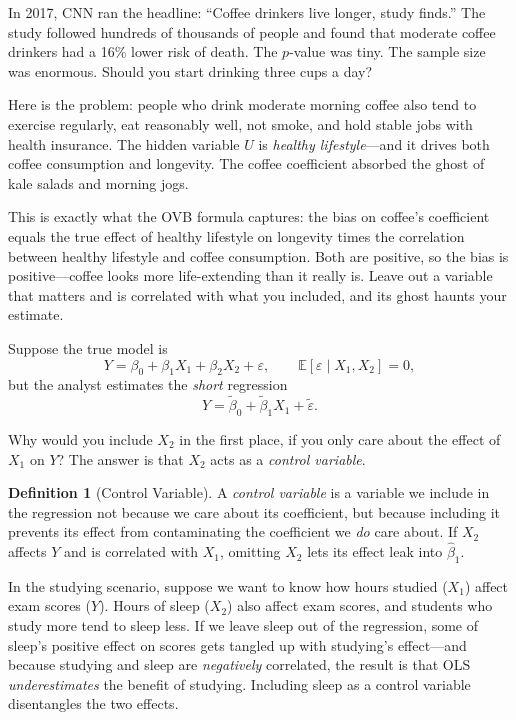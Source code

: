 \documentclass[11pt,a4paper]{article}
\theoremstyle{definition}
\newtheorem{definition}{Definition}[section]
\theoremstyle{plain}
\theoremstyle{remark}
\newcommand{\E}{\mathbb{E}}
\newcommand{\bhat}{\hat{\beta}}
\begin{document}
\begin{toystory}[title={The CNN Coffee Miracle}]
In 2017, CNN ran the headline: ``Coffee drinkers live longer, study finds.'' The study followed hundreds of thousands of people and found that moderate coffee drinkers had a 16\% lower risk of death. The $p$-value was tiny. The sample size was enormous. Should you start drinking three cups a day?

Here is the problem: people who drink moderate morning coffee also tend to exercise regularly, eat reasonably well, not smoke, and hold stable jobs with health insurance. The hidden variable $U$ is \emph{healthy lifestyle}---and it drives both coffee consumption and longevity. The coffee coefficient absorbed the ghost of kale salads and morning jogs.

This is exactly what the OVB formula captures: the bias on coffee's coefficient equals the true effect of healthy lifestyle on longevity times the correlation between healthy lifestyle and coffee consumption. Both are positive, so the bias is positive---coffee looks more life-extending than it really is. Leave out a variable that matters and is correlated with what you included, and its ghost haunts your estimate.
\end{toystory}

Suppose the true model is
\begin{equation}\label{eq:long}
  Y = \beta_0 + \beta_1 X_1 + \beta_2 X_2 + \varepsilon, \qquad \E[\varepsilon \mid X_1, X_2] = 0,
\end{equation}
but the analyst estimates the \emph{short} regression
\begin{equation}\label{eq:short}
  Y = \tilde\beta_0 + \tilde\beta_1 X_1 + \tilde\varepsilon.
\end{equation}

Why would you include $X_2$ in the first place, if you only care about the effect of $X_1$ on $Y$? The answer is that $X_2$ acts as a \emph{control variable}.

\begin{definition}[Control Variable]
A \emph{control variable} is a variable we include in the regression not because we care about its coefficient, but because including it prevents its effect from contaminating the coefficient we \emph{do} care about. If $X_2$ affects $Y$ and is correlated with $X_1$, omitting $X_2$ lets its effect leak into $\bhat_1$.
\end{definition}

In the studying scenario, suppose we want to know how hours studied ($X_1$) affect exam scores ($Y$). Hours of sleep ($X_2$) also affect exam scores, and students who study more tend to sleep less. If we leave sleep out of the regression, some of sleep's positive effect on scores gets tangled up with studying's effect---and because studying and sleep are \emph{negatively} correlated, the result is that OLS \emph{underestimates} the benefit of studying. Including sleep as a control variable disentangles the two effects.
\end{document}
